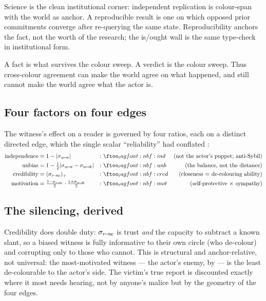 \documentclass[../main]{subfiles}
\begin{document}
Science is the clean institutional corner: independent replication is colour-span with the
world as anchor. A reproducible result is one on which opposed prior commitments converge
after re-querying the same state. Reproducibility anchors the fact, not the worth of the
research; the is/ought wall is the same type-check in institutional form.

A fact is what survives the colour sweep. A verdict is the colour sweep. Thus cross-colour
agreement can make the world agree on what happened, and still cannot make the world agree
what the actor is.

\subsection{Four factors on four edges}
\label{subsec:rep:factors}
%
\begin{definition}
  The witness's effect on a reader is governed by four ratios, each on a distinct directed
  edge, which the single scalar ``reliability'' had conflated :
  \begin{align}
    \text{independence} &= 1-|\lean{w}{i}|
      &:& \eqtag{bf:ind}{not the actor's puppet; anti-Sybil}\\
    \text{unbias} &= 1-\tfrac12|\lean{w}{i}-\lean{w}{k}|
      &:& \eqtag{bf:unb}{the balance, not the distance}\\
    \text{credibility} &= (\lean{r}{w})_{+}
      &:& \eqtag{bf:cred}{closeness $=$ de-colouring ability}\\
    \text{motivation} &= \tfrac{1-\lean{i}{w}}{2}\cdot\tfrac{1+\lean{w}{k}}{2}
      &:& \eqtag{bf:mot}{self-protective $\times$ sympathy}
  \end{align}
\end{definition}

\subsection{The silencing, derived}
\label{subsec:rep:silencing}
%
\begin{insight}
  Credibility does double duty: $\sigma\sb{ r\!\to\!w }$ is trust \emph{and} the capacity to subtract a
  known slant, so a biased witness is fully informative to their own circle (who de-colour)
  and corrupting only to those who cannot. This is structural and anchor-relative, not
  universal: the most-motivated witness --- the actor's enemy, by  --- is the
  least de-colourable to the actor's side. The victim's true report is discounted exactly
  where it most needs hearing, not by anyone's malice but by the geometry of the four edges.
\end{insight}
\end{document}
